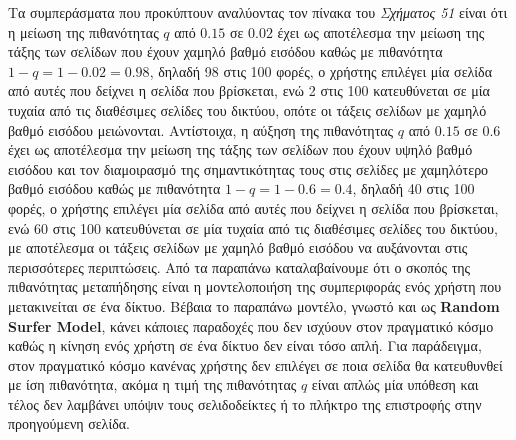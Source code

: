 \documentclass[First Project.tex]{subfiles}
\begin{document}
Τα συμπεράσματα που προκύπτουν αναλύοντας τον πίνακα του \textit{Σχήματος 51} είναι ότι η μείωση της πιθανότητας $q$ από $0.15$ σε $0.02$   
έχει ως αποτέλεσμα την μείωση της τάξης των σελίδων που έχουν χαμηλό βαθμό εισόδου καθώς με πιθανότητα $1-q = 1-0.02 = 0.98$, δηλαδή 98 στις
100 φορές, ο χρήστης επιλέγει μία σελίδα από αυτές που δείχνει η σελίδα που βρίσκεται, ενώ 2 στις 100 κατευθύνεται σε μία τυχαία από τις
διαθέσιμες σελίδες του δικτύου, οπότε οι τάξεις σελίδων με χαμηλό βαθμό εισόδου μειώνονται. Αντίστοιχα, η αύξηση της πιθανότητας $q$ από $0.15$ σε $0.6$ 
έχει ως αποτέλεσμα την μείωση της τάξης των σελίδων που έχουν υψηλό βαθμό εισόδου και τον διαμοιρασμό της σημαντικότητας τους στις σελίδες
με χαμηλότερο βαθμό εισόδου καθώς με πιθανότητα $1-q = 1-0.6 = 0.4$, δηλαδή 40 στις 100 φορές, ο χρήστης επιλέγει μία σελίδα από αυτές που
δείχνει	η σελίδα που βρίσκεται, ενώ 60 στις 100 κατευθύνεται σε μία τυχαία από τις διαθέσιμες σελίδες του δικτύου, με αποτέλεσμα οι τάξεις 
σελίδων με χαμηλό βαθμό εισόδου να αυξάνονται στις περισσότερες περιπτώσεις. Από τα παραπάνω καταλαβαίνουμε ότι ο σκοπός της πιθανότητας 
μεταπήδησης είναι η μοντελοποιήση της συμπεριφοράς ενός χρήστη που μετακινείται σε ένα δίκτυο. Βέβαια το παραπάνω μοντέλο, γνωστό και ως 
\textlatin{\textbf{Random Surfer Model}}, κάνει κάποιες παραδοχές που δεν ισχύουν στον πραγματικό κόσμο καθώς η κίνηση ενός χρήστη σε ένα 
δίκτυο δεν είναι τόσο απλή. Για παράδειγμα, στον πραγματικό κόσμο κανένας χρήστης δεν επιλέγει σε ποια σελίδα θα κατευθυνθεί με ίση 
πιθανότητα, ακόμα η τιμή της πιθανότητας $q$ είναι απλώς μία υπόθεση και τέλος δεν λαμβάνει υπόψιν τους σελιδοδείκτες ή το πλήκτρο της 
επιστροφής στην προηγούμενη σελίδα.
\end{document}
